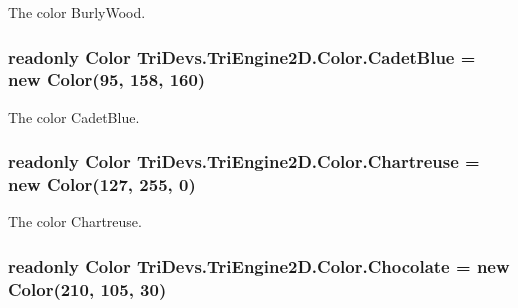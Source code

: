 The color Burly\-Wood. 

\hypertarget{struct_tri_devs_1_1_tri_engine2_d_1_1_color_ae16d655a65d6c625537449b1ec4924e3}{
\subsubsection[{Cadet\-Blue}]{\setlength{\rightskip}{0pt plus 5cm}readonly {\bf Color} Tri\-Devs.\-Tri\-Engine2\-D.\-Color.\-Cadet\-Blue = new {\bf Color}(95, 158, 160)\hspace{0.3cm}{\ttfamily [static]}}}\label{struct_tri_devs_1_1_tri_engine2_d_1_1_color_ae16d655a65d6c625537449b1ec4924e3}


The color Cadet\-Blue. 

\hypertarget{struct_tri_devs_1_1_tri_engine2_d_1_1_color_a155d33448ef0bb8fe0267b9219e0fc62}{
\subsubsection[{Chartreuse}]{\setlength{\rightskip}{0pt plus 5cm}readonly {\bf Color} Tri\-Devs.\-Tri\-Engine2\-D.\-Color.\-Chartreuse = new {\bf Color}(127, 255, 0)\hspace{0.3cm}{\ttfamily [static]}}}\label{struct_tri_devs_1_1_tri_engine2_d_1_1_color_a155d33448ef0bb8fe0267b9219e0fc62}


The color Chartreuse. 

\hypertarget{struct_tri_devs_1_1_tri_engine2_d_1_1_color_affde6ccebba274eac5a5e853b9c4508e}{
\subsubsection[{Chocolate}]{\setlength{\rightskip}{0pt plus 5cm}readonly {\bf Color} Tri\-Devs.\-Tri\-Engine2\-D.\-Color.\-Chocolate = new {\bf Color}(210, 105, 30)\hspace{0.3cm}{\ttfamily [static]}}}\label{struct_tri_devs_1_1_tri_engine2_d_1_1_color_affde6ccebba274eac5a5e853b9c4508e}


